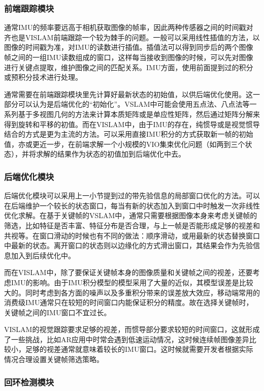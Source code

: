 \subsubsection{前端跟踪模块}

通常IMU的频率要远高于相机获取图像的帧率，因此两种传感器之间的时间戳对齐也是VISLAM前端跟踪一个较为棘手的问题。一般可以采用线性插值的方法，以图像的时间戳为准，对IMU的读数进行插值。插值法可以得到同步后的两个图像帧之间的一组IMU读数组成的窗口，这样每当接收到图像的时候，可以先对图像进行关键点提取，维护图像之间的匹配关系。IMU方面，使用前面提到过的积分或预积分技术进行处理。

通常需要在前端跟踪模块里先计算好最新状态的初始值，以供后端优化使用。这一部分可以认为是后端优化的“初始化”。VSLAM中可能会使用五点法、八点法等一系列基于多视图几何的方法来计算本质矩阵或是单应性矩阵，然后通过矩阵分解来得到旋转和平移的初值。而在VISLAM中，由于IMU的存在，纯惯导或是视觉惯导结合的方式是更为主流的方法。可以采用直接IMU积分的方式获取新一帧的初始值，亦或更近一步，在前端求解一个小规模的VIO集束优化问题（如两到三个状态），并将求解的结果作为状态的初值加到后端优化中去。

\subsubsection{后端优化模块}

后端优化模块可以采用上一小节提到过的带先验信息的局部窗口优化的方法。可以在后端维护一个较长的状态窗口，每当有新的状态加入到窗口中时触发一次非线性优化求解。在基于关键帧的VSLAM中，通常只需要根据图像本身来考虑关键帧的筛选，比如特征是否丰富、特征分布是否合理，与上一帧是否能形成足够的视差和共视等。在窗口滑动的时候也有不同的做法：顺序滑动，或用最新的状态替换窗口中最新的状态。离开窗口的状态则以边缘化的方式滑出窗口，其结果会作为先验信息加入到后续优化中。

而在VISLAM中，除了要保证关键帧本身的图像质量和关键帧之间的视差，还要考虑IMU的影响。由于IMU积分模型的模型采用了大量的近似，其模型误差是比较大的。同时考虑到各方面的噪声以及多重积分带来的误差放大效应，移动端常用的消费级IMU通常只在较短的时间窗口内能保证积分的精度。故在选择关键帧时，关键帧之间的IMU窗口不宜过长。

VISLAM的视觉跟踪要求足够的视差，而惯导部分要求较短的时间窗口，这就形成了一些挑战，比如AR应用中时常会遇到低速运动情况，这时候连续帧图像差异比较小，足够的视差通常就意味着较长的IMU窗口。这时候就需要开发者根据实际情况合理设置关键帧筛选策略。

\subsubsection{回环检测模块}

